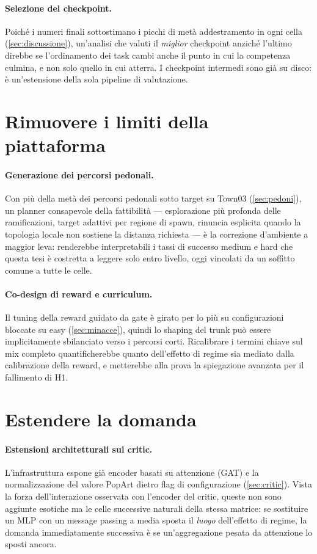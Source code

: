 \paragraph{Selezione del checkpoint.}
Poiché i numeri finali sottostimano i picchi di metà addestramento in
ogni cella (\cref{sec:discussione}), un'analisi che valuti il
\emph{miglior} checkpoint anziché l'ultimo direbbe se l'ordinamento dei
task cambi anche il punto in cui la competenza culmina, e non solo
quello in cui atterra. I checkpoint intermedi sono già su disco: è
un'estensione della sola pipeline di valutazione.

\section{Rimuovere i limiti della piattaforma}
\label{sec:evo-piattaforma}

\paragraph{Generazione dei percorsi pedonali.}
Con più della metà dei percorsi pedonali sotto target su Town03
(\cref{sec:pedoni}), un planner consapevole della fattibilità ---
esplorazione più profonda delle ramificazioni, target adattivi per
regione di spawn, rinuncia esplicita quando la topologia locale non
sostiene la distanza richiesta --- è la correzione d'ambiente a maggior
leva: renderebbe interpretabili i tassi di successo medium e hard che
questa tesi è costretta a leggere solo entro livello, oggi vincolati da
un soffitto comune a tutte le celle.

\paragraph{Co-design di reward e curriculum.}
Il tuning della reward guidato da gate è girato per lo più su
configurazioni bloccate su easy (\cref{sec:minacce}), quindi lo shaping
del trunk può essere implicitamente sbilanciato verso i percorsi corti.
Ricalibrare i termini chiave sul mix completo quantificherebbe quanto
dell'effetto di regime sia mediato dalla calibrazione della reward, e
metterebbe alla prova la spiegazione avanzata per il fallimento di H1.

\section{Estendere la domanda}
\label{sec:evo-estensioni}

\paragraph{Estensioni architetturali sul critic.}
L'infrastruttura espone già encoder basati su attenzione (GAT) e la
normalizzazione del valore PopArt dietro flag di configurazione
(\cref{sec:critic}). Vista la forza dell'interazione osservata con
l'encoder del critic, queste non sono aggiunte esotiche ma le celle
successive naturali della stessa matrice: se sostituire un MLP con un
message passing a media sposta il \emph{luogo} dell'effetto di regime,
la domanda immediatamente successiva è se un'aggregazione pesata da
attenzione lo sposti ancora.


